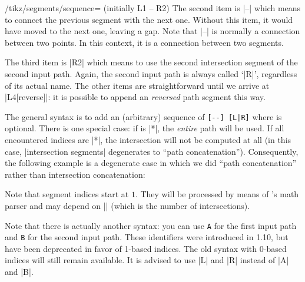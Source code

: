 {\begin{key}{/tikz/segments/sequence= (initially L1 -- R2)}
    The second item is |--| which means to connect the previous segment with
    the next one. Without this item, it would have moved to the next one,
    leaving a gap. Note that |--| is normally a connection between two points.
    In this context, it is a connection between two segments.

    The third item is |R2| which means to use the second intersection segment
    of the second input path. Again, the second input path is always called
    `|R|', regardless of its actual name. The other items are straightforward
    until we arrive at |L4[reverse]|: it is possible to append an
    \emph{reversed} path segment this way.

    The general syntax is to add an (arbitrary) sequence of \verb.[--] [L|R].
     where  is optional. There is
    one special case: if  is |*|, the \emph{entire} path will be
    used. If all encountered indices are |*|, the intersection will not be
    computed at all (in this case, |intersection segments| degenerates to
    ``path concatenation''). Consequently, the following example is a
    degenerate case in which we did ``path concatenation'' rather than
    intersection concatenation:
\begin{codeexample}[]
\end{codeexample}

    Note that segment indices start at $1$. They will be processed by means of
    \pgfname's math parser and may depend on |\pgfintersectionsolutions| (which
    is the number of intersections).

    Note that there is actually another syntax: you can use
    \texttt{A} for the first input path and
    \texttt{B} for the second input path. These identifiers
    were introduced in \PGFPlots{} 1.10, but have been deprecated in favor of
    1-based indices. The old syntax with 0-based indices will still remain
    available. It is advised to use |L| and |R| instead of |A| and |B|.


\end{key}}
